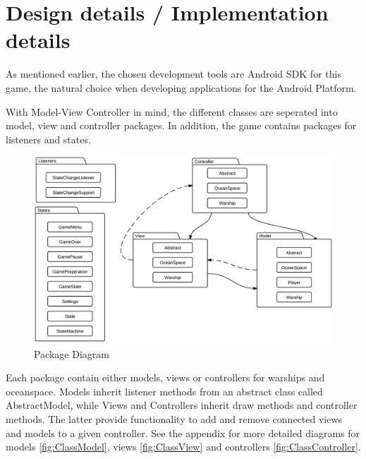 \chapter{Design details / Implementation details}



As mentioned earlier, the chosen development tools are Android SDK for this game, the natural choice when developing applications for the Android Platform. 

With Model-View Controller in mind, the different classes are seperated into model, view and controller packages. In addition, the game contains packages for listeners and states. 

\begin{figure}[ht]
    \includegraphics[width=\textwidth]{img/PackageDiagram.png}
    \caption{Package Diagram}
    \label{fig:PackageDiagram}
\end{figure}

Each package contain either models, views or controllers for warships and oceanspace. Models inherit listener methods from an abstract class called AbstractModel, while Views and Controllers inherit draw methods and controller methods. The latter provide functionality to add and remove connected views and models to a given controller. See the appendix for more detailed diagrams for models \ref{fig:ClassModel}, views \ref{fig:ClassView} and controllers \ref{fig:ClassController}.


